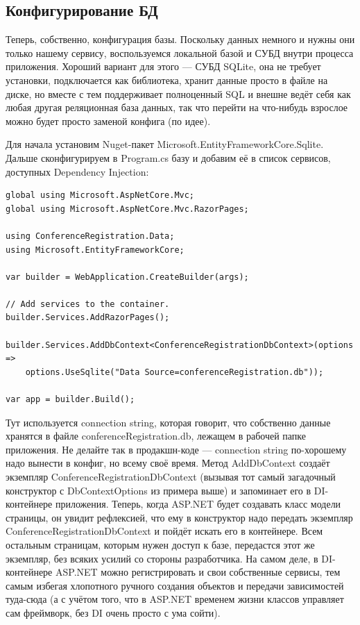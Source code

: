 \documentclass{../../text-style}
\begin{document}
\subsection{Конфигурирование БД}

Теперь, собственно, конфигурация базы. Поскольку данных немного и нужны они только нашему сервису, воспользуемся локальной базой и СУБД внутри процесса приложения. Хороший вариант для этого --- СУБД SQLite, она не требует установки, подключается как библиотека, хранит данные просто в файле на диске, но вместе с тем поддерживает полноценный SQL и внешне ведёт себя как любая другая реляционная база данных, так что перейти на что-нибудь взрослое можно будет просто заменой конфига (по идее).

Для начала установим Nuget-пакет Microsoft.EntityFrameworkCore.Sqlite. Дальше сконфигурируем в Program.cs базу и добавим её в список сервисов, доступных Dependency Injection:

\begin{verbatim}
global using Microsoft.AspNetCore.Mvc;
global using Microsoft.AspNetCore.Mvc.RazorPages;

using ConferenceRegistration.Data;
using Microsoft.EntityFrameworkCore;

var builder = WebApplication.CreateBuilder(args);

// Add services to the container.
builder.Services.AddRazorPages();

builder.Services.AddDbContext<ConferenceRegistrationDbContext>(options =>
    options.UseSqlite("Data Source=conferenceRegistration.db"));

var app = builder.Build();
\end{verbatim}

Тут используется connection string, которая говорит, что собственно данные хранятся в файле conferenceRegistration.db, лежащем в рабочей папке приложения. Не делайте так в продакшн-коде --- connection string по-хорошему надо вынести в конфиг, но всему своё время. Метод AddDbContext создаёт экземпляр ConferenceRegistrationDbContext (вызывая тот самый загадочный конструктор с DbContextOptions из примера выше) и запоминает его в DI-контейнере приложения. Теперь, когда ASP.NET будет создавать класс модели страницы, он увидит рефлексией, что ему в конструктор надо передать экземпляр ConferenceRegistrationDbContext и пойдёт искать его в контейнере. Всем остальным страницам, которым нужен доступ к базе, передастся этот же экземпляр, без всяких усилий со стороны разработчика. На самом деле, в DI-контейнере ASP.NET можно регистрировать и свои собственные сервисы, тем самым избегая хлопотного ручного создания объектов и передачи зависимостей туда-сюда (а с учётом того, что в ASP.NET временем жизни классов управляет сам фреймворк, без DI очень просто с ума сойти).
\end{document}

